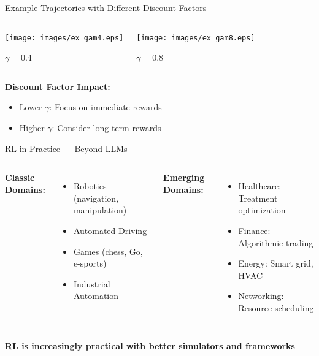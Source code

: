 \documentclass[aspectratio=169]{beamer}
\begin{document}
\begin{frame}{Example Trajectories with Different Discount Factors}
  \begin{columns}
    \begin{center}
      \texttt{[image: images/ex\_gam4.eps]}
      
      \textbf{$\gamma = 0.4$}
    \end{center}
    
    \begin{center}
      \texttt{[image: images/ex\_gam8.eps]}
      
      \textbf{$\gamma = 0.8$}
    \end{center}
  \end{columns}
  
  \vspace{0.5cm}
  \textbf{Discount Factor Impact:}
  \begin{itemize}
    \item Lower $\gamma$: Focus on immediate rewards
    \item Higher $\gamma$: Consider long-term rewards
  \end{itemize}
\end{frame}

\begin{frame}{RL in Practice — Beyond LLMs}
  \begin{columns}
    \textbf{Classic Domains:}
    \begin{itemize}
      \item Robotics (navigation, manipulation)
      \item Automated Driving
      \item Games (chess, Go, e-sports)
      \item Industrial Automation
    \end{itemize}

    \textbf{Emerging Domains:}
    \begin{itemize}
      \item Healthcare: Treatment optimization
      \item Finance: Algorithmic trading
      \item Energy: Smart grid, HVAC
      \item Networking: Resource scheduling
    \end{itemize}
  \end{columns}

  \vspace{0.5cm}
  \centering
  \textbf{RL is increasingly practical with better simulators and frameworks}
\end{frame}
\end{document}
